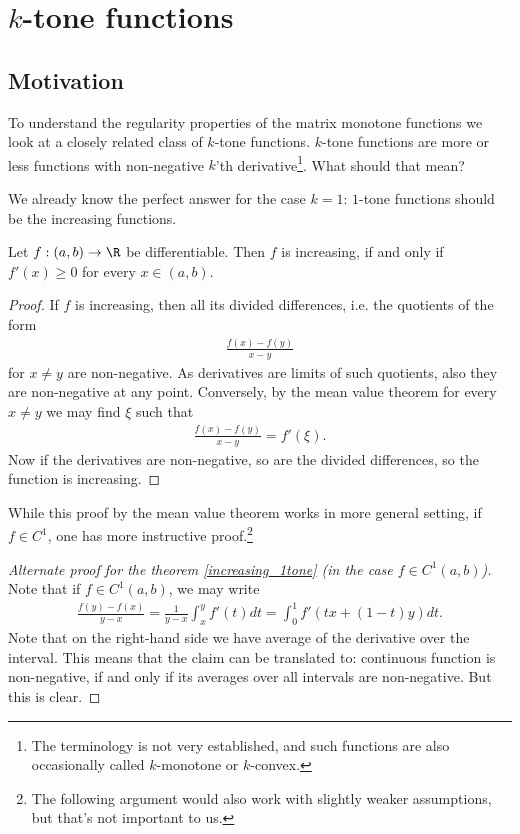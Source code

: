 \chapter{$k$-tone functions}

\section{Motivation}

To understand the regularity properties of the matrix monotone functions we look at a closely related class of $k$-tone functions. $k$-tone functions are more or less functions with non-negative $k$'th derivative\footnote{The terminology is not very established, and such functions are also occasionally called $k$-monotone or $k$-convex.}. What should that mean?

We already know the perfect answer for the case $k = 1$: $1$-tone functions should be the increasing functions.

\begin{lause}\label{increasing_1tone}
	Let $f : (a, b) \to \R$ be differentiable. Then $f$ is increasing, if and only if $f'(x) \geq 0$ for every $x \in (a, b)$.
\end{lause}

\begin{proof}
	If $f$ is increasing, then all its divided differences, i.e. the quotients of the form
	\begin{align*}
		\frac{f(x) - f(y)}{x - y}
	\end{align*}
	for $x \neq y$ are non-negative. As derivatives are limits of such quotients, also they are non-negative at any point. Conversely, by the mean value theorem for every $x \neq y$ we may find $\xi$ such that
	\begin{align*}
		\frac{f(x) - f(y)}{x - y} = f'(\xi).
	\end{align*}
	Now if the derivatives are non-negative, so are the divided differences, so the function is increasing.
\end{proof}

While this proof by the mean value theorem works in more general setting, if $f \in C^{1}$, one has more instructive proof.\footnote{The following argument would also work with slightly weaker assumptions, but that's not important to us.}

\begin{proof}[Alternate proof for the theorem \ref{increasing_1tone} (in the case $f \in C^{1}(a, b)$)]
	Note that if $f \in C^{1}(a, b)$, we may write
	\begin{align*}
		\frac{f(y) - f(x)}{y - x} = \frac{1}{y - x}\int_{x}^{y} f'(t) dt = \int_{0}^{1} f'(t x + (1 - t) y) dt.
	\end{align*}
	Note that on the right-hand side we have average of the derivative over the interval. This means that the claim can be translated to: continuous function is non-negative, if and only if its averages over all intervals are non-negative. But this is clear.
\end{proof}

